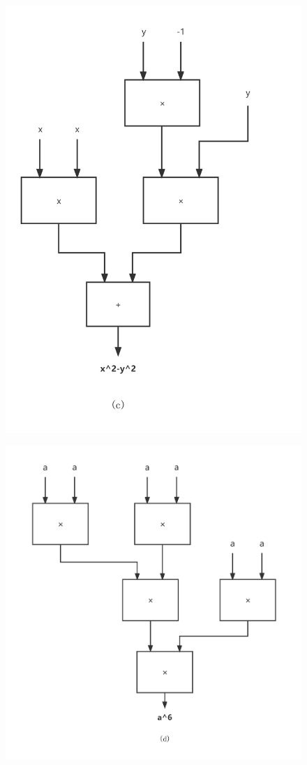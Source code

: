 \documentclass{article}
\begin{document}
\begin{figure}[h]
    \centering
    \includegraphics*[scale=0.25]{02.png}
\end{figure}
\begin{figure}[h]
    \centering
    \includegraphics[scale=0.25]{03.png}
\end{figure}
\clearpage
\end{document}
